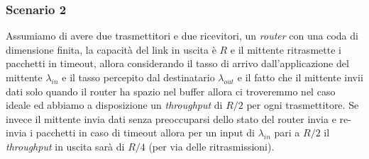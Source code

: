         \subsubsection{Scenario 2}
            Assumiamo di avere due trasmettitori e due ricevitori, un \textit{router} con una coda di dimensione finita, la capacità del link in uscita è $ R $ e il mittente ritrasmette i pacchetti in timeout, allora considerando il tasso di arrivo dall'applicazione del mittente $\lambda_{in}$ e il tasso percepito dal destinatario $\lambda_{out}$ e il fatto che il mittente invii dati solo quando il router ha spazio nel buffer allora ci troveremmo nel caso ideale ed abbiamo a disposizione un \textit{throughput} di $ R/2 $ per ogni trasmettitore. Se invece il mittente invia dati senza preoccuparsi dello stato del router invia e re-invia i pacchetti in caso di timeout allora per un input di $\lambda_{in}$ pari a $ R/2 $ il \textit{throughput} in uscita sarà di $ R/4 $ (per via delle ritrasmissioni).
